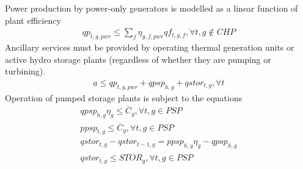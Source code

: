 \documentclass[preprint, 12pt, authoryear]{elsarticle}
\begin{document}
Power production by power-only generators is modelled as a linear function of plant efficiency
\begin{align}
qp_{t,g,pwr} \leq \sum_{f} \eta_{g,f,pwr} qf_{t,g,f}, \forall t, g \notin CHP  
\end{align}
Ancillary services must be provided by operating thermal generation units or active hydro storage plants (regardless of whether they are pumping or turbining).
\begin{align}
\underline{a} \leq qp_{t,g,pwr} + qpsp_{h,g} + qstor_{t,g}, \forall t
\end{align}
Operation of pumped storage plants is subject to the equations
\begin{align}
qpsp_{h,g} \eta_{g} \leq \overline{C}_{g}, \forall t, g \in PSP \\
ppsp_{t,g} \leq \overline{C}_{g}, \forall t, g \in PSP \\
qstor_{t,g} - qstor_{t-1, g} = ppsp_{h,g} \eta_{g} - qpsp_{h,g} \\
qstor_{t,g} \leq \overline{STOR}_{g}, \forall t, g \in PSP
\end{align}
\end{document}
